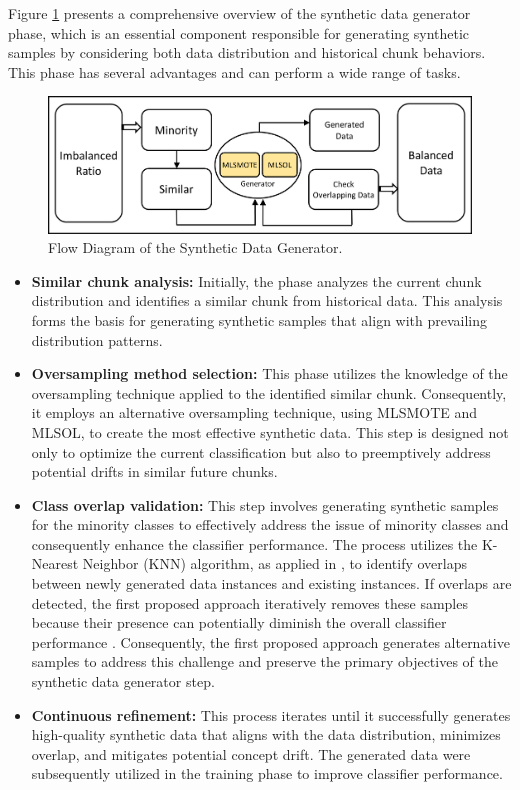 Figure \ref{fig:4_first_proposal_step_2} presents a comprehensive overview of the synthetic data generator phase, which is an essential component responsible for generating synthetic samples by considering both data distribution and historical chunk behaviors. This phase has several advantages and can perform a wide range of tasks.
\begin{figure}[H]
	\centering
	\includegraphics[width=1\linewidth]{4_Imbalanced/figures/approach_step_2.png}
	\caption{Flow Diagram of the Synthetic Data Generator.}
	\label{fig:4_first_proposal_step_2}
\end{figure}
\begin{itemize}
	\item \textbf{Similar chunk analysis:} Initially, the phase analyzes the current chunk distribution and identifies a similar chunk from historical data. This analysis forms the basis for generating synthetic samples that align with prevailing distribution patterns.
	\item \textbf{Oversampling method selection:} This phase utilizes the knowledge of the oversampling technique applied to the identified similar chunk. Consequently, it employs an alternative oversampling technique, using MLSMOTE and MLSOL, to create the most effective synthetic data. This step is designed not only to optimize the current classification but also to preemptively address potential drifts in similar future chunks.
	\item \textbf{Class overlap validation:} This step involves generating synthetic samples for the minority classes to effectively address the issue of minority classes and consequently enhance the classifier performance. The process utilizes the K-Nearest Neighbor (KNN) algorithm, as applied in \cite{lu2016concept}, to identify overlaps between newly generated data instances and existing instances. If overlaps are detected, the first proposed approach iteratively removes these samples because their presence can potentially diminish the overall classifier performance \cite{cruz2017meta, widmer1996learning}. Consequently, the first proposed approach generates alternative samples to address this challenge and preserve the primary objectives of the synthetic data generator step.
	\item \textbf{Continuous refinement:} This process iterates until it successfully generates high-quality synthetic data that aligns with the data distribution, minimizes overlap, and mitigates potential concept drift. The generated data were subsequently utilized in the training phase to improve classifier performance.
\end{itemize}
